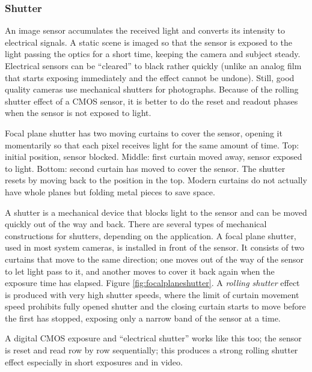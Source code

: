 
\subsubsection{Shutter} %


An image sensor accumulates the received light and converts its intensity to electrical signals.
A static scene is imaged so that the sensor is exposed to the light passing the optics for a short time, keeping the camera and subject steady.
Electrical sensors can be ``cleared'' to black rather quickly (unlike an analog film that starts exposing immediately and the effect cannot be undone). Still, good quality cameras use mechanical shutters for photographs.
Because of the rolling shutter effect of a CMOS sensor, it is better to do the reset and readout phases when the sensor is not exposed to light.


{Focal plane shutter has two moving curtains to cover the sensor, opening it momentarily so that each pixel receives light for the same amount of time.
Top: initial position, sensor blocked.
Middle: first curtain moved away, sensor exposed to light.
Bottom: second curtain has moved to cover the sensor.
The shutter resets by moving back to the position in the top.
Modern curtains do not actually have whole planes but folding metal pieces to save space.}


A shutter is a mechanical device that blocks light to the sensor and can be moved quickly out of the way and back.
There are several types of mechanical constructions for shutters, depending on the application.
A focal plane shutter, used in most system cameras, is installed in front of the sensor.
It consists of two curtains that move to the same direction; one moves out of the way of the sensor to let light pass to it, and another moves to cover it back again when the exposure time has elapsed.
Figure \ref{fig:focalplaneshutter}.
A \emph{rolling shutter} effect is produced with very high shutter speeds, where the limit of curtain movement speed prohibits fully opened shutter and the closing curtain starts to move before the first has stopped, exposing only a narrow band of the sensor at a time.

A digital CMOS exposure and ``electrical shutter'' works like this too; the sensor is reset and read row by row sequentially; this produces a strong rolling shutter effect especially in short exposures and in video.

